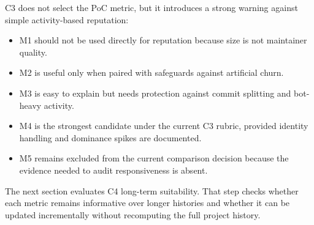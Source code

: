 C3 does not select the PoC metric, but it introduces a strong warning against simple activity-based reputation:
\begin{itemize}[leftmargin=*]
  \item M1 should not be used directly for reputation because size is not maintainer quality.
  \item M2 is useful only when paired with safeguards against artificial churn.
  \item M3 is easy to explain but needs protection against commit splitting and bot-heavy activity.
  \item M4 is the strongest candidate under the current C3 rubric, provided identity handling and dominance spikes are documented.
  \item M5 remains excluded from the current comparison decision because the evidence needed to audit responsiveness is absent.
\end{itemize}

The next section evaluates C4 long-term suitability. That step checks whether each metric remains informative over
longer histories and whether it can be updated incrementally without recomputing the full project history.
